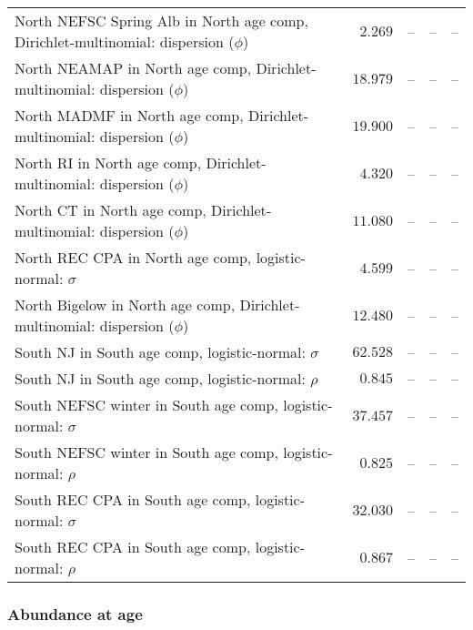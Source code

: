 \documentclass[
]{article}
\begin{document}
\begin{landscape}
\begin{longtable}[t]{lrrrr}
North NEFSC Spring Alb in North age comp, Dirichlet-multinomial: dispersion ($\phi$) & $2.269$ & -- & -- & --\\
North NEAMAP in North age comp, Dirichlet-multinomial: dispersion ($\phi$) & $18.979$ & -- & -- & --\\
\addlinespace
North MADMF in North age comp, Dirichlet-multinomial: dispersion ($\phi$) & $19.900$ & -- & -- & --\\
North RI in North age comp, Dirichlet-multinomial: dispersion ($\phi$) & $4.320$ & -- & -- & --\\
North CT in North age comp, Dirichlet-multinomial: dispersion ($\phi$) & $11.080$ & -- & -- & --\\
North REC CPA in North age comp, logistic-normal: $\sigma$ & $4.599$ & -- & -- & --\\
North Bigelow in North age comp, Dirichlet-multinomial: dispersion ($\phi$) & $12.480$ & -- & -- & --\\
\addlinespace
South NJ in South age comp, logistic-normal: $\sigma$ & $62.528$ & -- & -- & --\\
South NJ in South age comp, logistic-normal: $\rho$ & $0.845$ & -- & -- & --\\
South NEFSC winter in South age comp, logistic-normal: $\sigma$ & $37.457$ & -- & -- & --\\
South NEFSC winter in South age comp, logistic-normal: $\rho$ & $0.825$ & -- & -- & --\\
South REC CPA in South age comp, logistic-normal: $\sigma$ & $32.030$ & -- & -- & --\\
\addlinespace
South REC CPA in South age comp, logistic-normal: $\rho$ & $0.867$ & -- & -- & --\\*
\end{longtable}
\end{landscape}

\hypertarget{abundance-at-age}{%
\subsubsection{Abundance at age}\label{abundance-at-age}}
\end{document}
